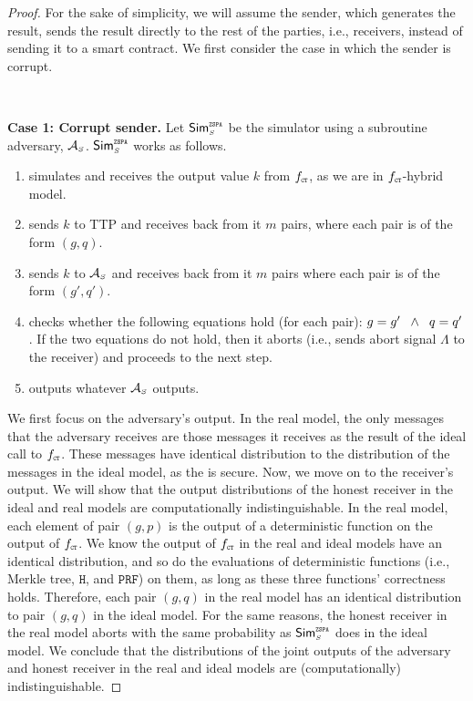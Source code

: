\begin{proof}
For the sake of simplicity, we will assume the sender, which generates the result, sends the result directly to the rest of the parties, i.e., receivers, instead of sending it to a smart contract. We first consider the case in which the sender is corrupt. 

\

\noindent\textbf{Case 1: Corrupt sender.}  Let $\mathsf{Sim}^{\scriptscriptstyle \mathtt{ZSPA}}_{\scriptscriptstyle S}$ be the simulator using a subroutine adversary, $\mathcal{A}_{\scriptscriptstyle S}$. $\mathsf{Sim}^{\scriptscriptstyle \mathtt{ZSPA}}_{\scriptscriptstyle S}$ works as follows. 
%
\begin{enumerate}
%
\item simulates  \ct  and receives the output value $k$ from $f_{\scriptscriptstyle \mathtt{CT}}$, as we are in $f_{\scriptscriptstyle \mathtt{CT}}$-hybrid model.
%
\item sends $k$ to TTP and receives back from it $m$ pairs, where each pair is of the form $( g,  q)$. 
%
\item sends $ k$ to $\mathcal{A}_{\scriptscriptstyle S}$ and receives back from it $m$ pairs  where each pair is of the form $( g',  q')$. 
%
\item checks whether the following equations hold (for each pair): $ g= g' \hspace{2mm} \wedge  \hspace{2mm}  q= q'$. If the two equations do not hold, then it aborts (i.e., sends abort signal $\Lambda$ to the receiver) and proceeds to the next step.
%
\item outputs whatever $\mathcal{A}_{\scriptscriptstyle S}$ outputs.
%
 \end{enumerate}
 
 We first focus on the adversary’s output. In the real model, the only messages that the adversary receives are those messages it receives as the result of the ideal call to $f_{\scriptscriptstyle \mathtt{CT}}$. These messages have identical distribution to the distribution of the messages in the ideal model, as the \ct is secure. Now, we move on to the receiver’s output. We will show that the output distributions of the honest receiver in the ideal and real models are computationally indistinguishable. In the real model,  each element of pair $(g, p)$ is the output of a deterministic function on the output of $f_{\scriptscriptstyle \mathtt{CT}}$. We know the output of $f_{\scriptscriptstyle \mathtt{CT}}$ in the real and ideal models have an identical distribution, and so do the evaluations of deterministic functions (i.e., Merkle tree, $\mathtt{H}$, and $\mathtt{PRF}$) on them, as long as these three functions' correctness holds. Therefore, each pair $(g,q)$ in the real model has an identical distribution to pair $(g,  q)$ in the ideal model.  For the same reasons, the honest receiver in the real model aborts with the same probability as  $\mathsf{Sim}^{\scriptscriptstyle \mathtt{ZSPA}}_{\scriptscriptstyle S}$ does in the ideal model.  We conclude that the distributions of the joint outputs of the adversary and honest receiver in the real and ideal models are  (computationally) indistinguishable. 


\end{proof}
